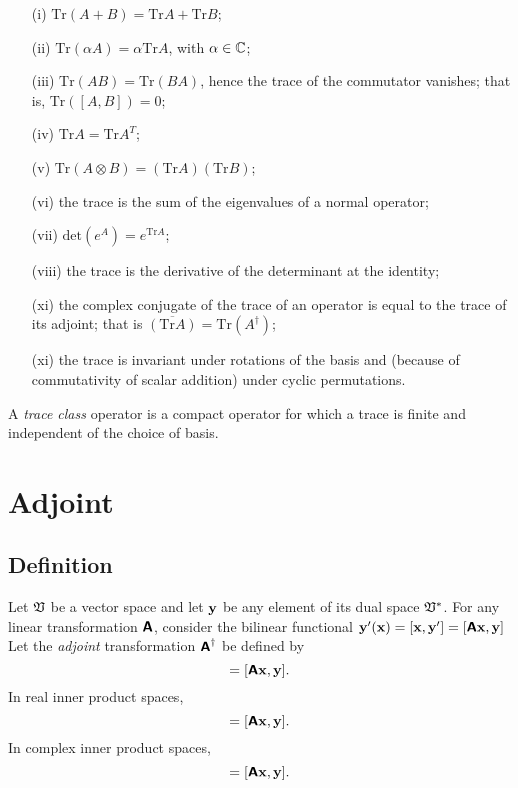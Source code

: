 \begin{itemize}
\item[(i)]
$\textrm{Tr}(A+B)=\textrm{Tr}A+\textrm{Tr}B$;
\item[(ii)]
$\textrm{Tr}(\alpha A)= \alpha \textrm{Tr}A$, with $\alpha \in {\Bbb C}$;
\item[(iii)]
$\textrm{Tr}(AB) = \textrm{Tr}(BA)$, hence the trace of the  commutator vanishes; that
is, $\textrm{Tr}([A,B])=0$;
\item[(iv)]
$\textrm{Tr}A = \textrm{Tr}A^T$;
\item[(v)]
$\textrm{Tr}(A\otimes B)= (\textrm{Tr}A) (\textrm{Tr}B)$;
\item[(vi)]
the trace is the sum of the eigenvalues of a normal operator;
\item[(vii)]
$ \textrm{det}(e^A)=e^{\textrm{Tr}A} $;
\item[(viii)]
 the trace is the derivative of the determinant at the identity;
\item[(xi)]
the complex conjugate of the trace of an operator is equal to the trace of its adjoint; that is
$\overline{(  \textrm{Tr} A)}=\textrm{Tr} (A^\dagger)$;
\item[(xi)]
the trace is invariant under rotations of the basis and (because of commutativity of scalar addition) under cyclic permutations.
\end{itemize}


A {\em trace class} operator is a compact operator for which a trace is finite and independent of the choice of basis.

\section{Adjoint}

\subsection{Definition}

Let ${\frak V}$ be a vector space and let ${\bf y}$
be any element of its dual space ${\frak V}^\ast$.
For any linear transformation $\textsf{\textbf{A}}$, consider
the bilinear functional
${\bf y}' ({\bf x}) =[{\bf x} ,{\bf y}'] =[\textsf{\textbf{A}}{\bf x},{\bf y}]$
Let the {\em adjoint} transformation $\textsf{\textbf{A}}^\dagger$ be defined by
\begin{equation}
[{\bf x},\textsf{\textbf{A}}^\ast{\bf y}]=
[\textsf{\textbf{A}}{\bf x},{\bf y}].
\end{equation}
In real inner product spaces,
\begin{equation}
[{\bf x},\textsf{\textbf{A}}^T{\bf y}]=
[\textsf{\textbf{A}}{\bf x},{\bf y}].
\end{equation}
In complex inner product spaces,
\begin{equation}
[{\bf x},\textsf{\textbf{A}}^\dagger{\bf y}]=
[\textsf{\textbf{A}}{\bf x},{\bf y}].
\end{equation}


